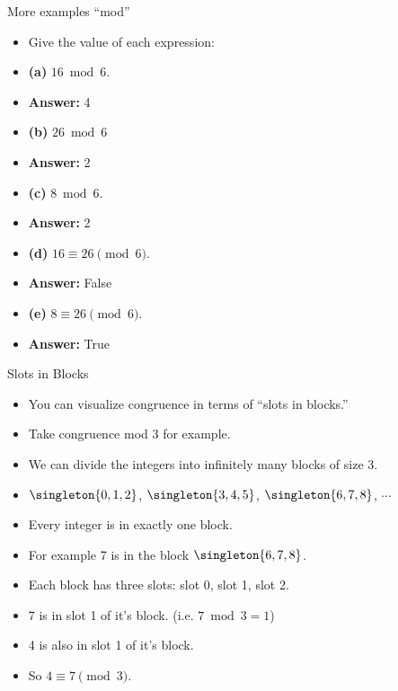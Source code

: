 \documentclass{beamer}
\begin{document}
\begin{frame}{More examples ``mod''}

\begin{itemize}
  \item Give the value of each expression:
  \item \textbf{(a)} $16 \bmod 6$.
  \item \textbf{Answer:} 4
  \item \textbf{(b)} $26 \bmod 6$
  \item \textbf{Answer:} 2
  \item \textbf{(c)} $8 \bmod 6$.
  \item \textbf{Answer:} 2
  \item \textbf{(d)} $16 \equiv 26 \pmod 6$.
  \item \textbf{Answer:} False
  \item \textbf{(e)} $8 \equiv 26 \pmod 6$.
  \item \textbf{Answer:} True
\end{itemize}

\end{frame}

\begin{frame}{Slots in Blocks}

\begin{itemize}
  \item  You can visualize congruence in terms of ``slots in blocks.''
  \item Take congruence mod 3 for example.
  \item We can divide the integers into infinitely many blocks of size 3.
  \item $\singleton{0,1,2}$, $\singleton{3,4,5}$, $\singleton{6,7,8}$, $\cdots$
  \item Every integer is in exactly one block.
  \item For example 7 is in the block $\singleton{6,7,8}$.
  \item Each block has three slots: slot 0, slot 1, slot 2.
  \item 7 is in slot 1 of it's block. (i.e. $7\bmod 3 = 1$)
  \item 4 is also in slot 1 of it's block.
  \item So $4\equiv 7 \pmod 3$.
\end{itemize}

\end{frame}
\end{document}

